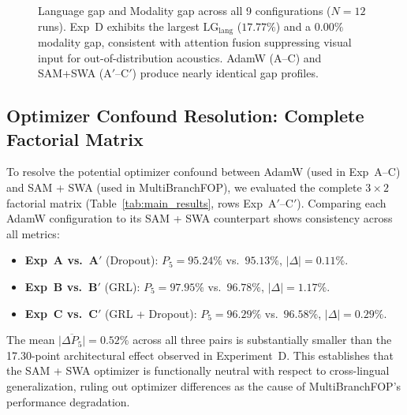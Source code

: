 \documentclass[conference]{IEEEtran}
\begin{document}
\begin{figure}[t]
\centering
{}
\caption{Language gap and Modality gap across all 9 configurations ($N=12$ runs).
Exp~D exhibits the largest $\text{LG}_{\text{lang}}$ ($17.77\%$) and a
$0.00\%$ modality gap, consistent with attention fusion suppressing visual
input for out-of-distribution acoustics.
AdamW (A--C) and SAM+SWA (A$'$--C$'$) produce nearly identical gap profiles.}
\label{fig:gaps_analysis}
\end{figure}

\subsection{Optimizer Confound Resolution: Complete Factorial Matrix}
\label{sec:optimizer_note}

To resolve the potential optimizer confound between AdamW (used in Exp~A--C) and SAM + SWA (used in MultiBranchFOP), we evaluated the complete $3 \times 2$ factorial matrix (Table~\ref{tab:main_results}, rows Exp~A$'$--C$'$).
Comparing each AdamW configuration to its SAM + SWA counterpart shows consistency across all metrics:
\begin{itemize}
    \item \textbf{Exp~A vs.\ A$'$} (Dropout): $P_5 = 95.24\%$ vs.\ $95.13\%$, $|\Delta| = 0.11\%$.
    \item \textbf{Exp~B vs.\ B$'$} (GRL): $P_5 = 97.95\%$ vs.\ $96.78\%$, $|\Delta| = 1.17\%$.
    \item \textbf{Exp~C vs.\ C$'$} (GRL + Dropout): $P_5 = 96.29\%$ vs.\ $96.58\%$, $|\Delta| = 0.29\%$.
\end{itemize}
The mean $\overline{|\Delta P_5|} = 0.52\%$ across all three pairs is substantially
smaller than the 17.30-point architectural effect observed in Experiment~D.
This establishes that the SAM + SWA optimizer is functionally neutral with respect
to cross-lingual generalization, ruling out optimizer differences as the cause
of MultiBranchFOP's performance degradation.
\end{document}
